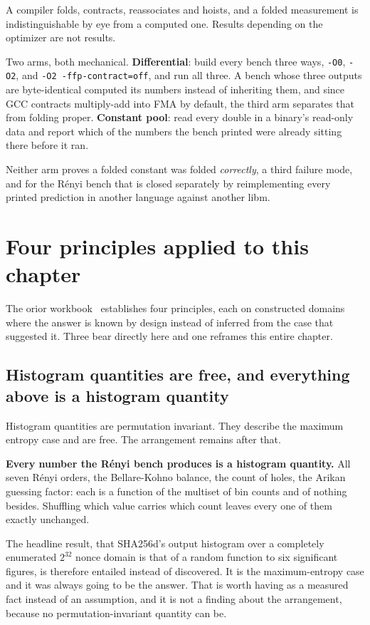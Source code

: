 A compiler folds, contracts, reassociates and hoists, and a folded measurement is indistinguishable by eye from a computed one. Results depending on the optimizer are not results.

Two arms, both mechanical. \textbf{Differential}: build every bench three ways, \texttt{-O0}, \texttt{-O2}, and \texttt{-O2 -ffp-contract=off}, and run all three. A bench whose three outputs are byte-identical computed its numbers instead of inheriting them, and since GCC contracts multiply-add into FMA by default, the third arm separates that from folding proper. \textbf{Constant pool}: read every double in a binary's read-only data and report which of the numbers the bench printed were already sitting there before it ran.

Neither arm proves a folded constant was folded \emph{correctly}, a third failure mode, and for the Rényi bench that is closed separately by reimplementing every printed prediction in another language against another libm.

\section{Four principles applied to this chapter}

The orior workbook~\cite{src:Quigg-orior-workbook} establishes four principles, each on constructed domains where the answer is known by design instead of inferred from the case that suggested it. Three bear directly here and one reframes this entire chapter.

\subsection{Histogram quantities are free, and everything above is a histogram quantity}

Histogram quantities are permutation invariant. They describe the maximum entropy case and are free. The arrangement remains after that.

\textbf{Every number the Rényi bench produces is a histogram quantity.} All seven Rényi orders, the Bellare-Kohno balance, the count of holes, the Arikan guessing factor: each is a function of the multiset of bin counts and of nothing besides. Shuffling which value carries which count leaves every one of them exactly unchanged.

The headline result, that SHA256d's output histogram over a completely enumerated \(2^{32}\) nonce domain is that of a random function to six significant figures, is therefore entailed instead of discovered. It is the maximum-entropy case and it was always going to be the answer. That is worth having as a measured fact instead of an assumption, and it is not a finding about the arrangement, because no permutation-invariant quantity can be.

